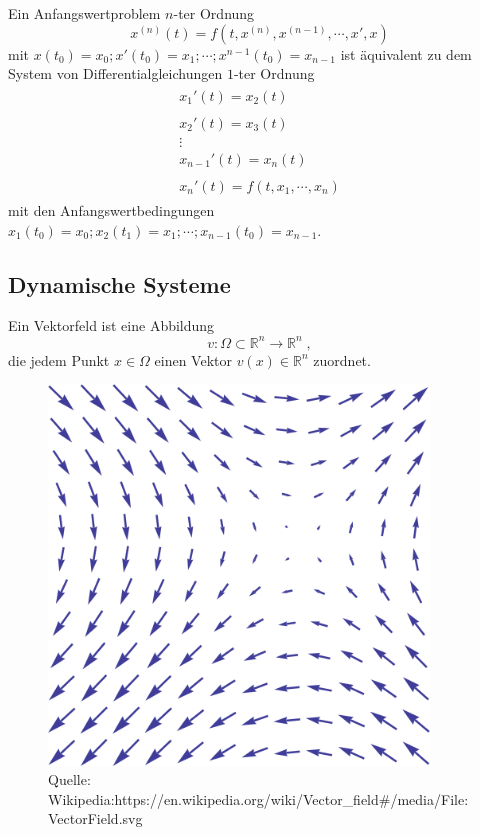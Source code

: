 \begin{Satz}
Ein Anfangswertproblem $n$-ter Ordnung
 $$ x^{(n)}(t) = f(t, x^{(n)}, x^{(n-1)} , \cdots , x', x) $$ mit  $x(t_0) = x_0 ; x'(t_0) = x_1; \cdots ; x^{n-1}(t_{0})= x_{n-1}  $ ist äquivalent zu dem System von   Differentialgleichungen $1$-ter Ordnung
\begin{align*}
\begin{matrix} x_1'(t) = x_2(t) \\  \\ x_2'(t) = x_3(t) \\  \vdots \\  x_{n-1}'(t) = x_n(t) \\ \\ x_n'(t) = f(t, x_1, \cdots, x_n )\end{matrix}
\end{align*}
mit den Anfangswertbedingungen  $x_1(t_0) = x_0 ; x_2(t_1) = x_1; \cdots ; x_{n-1}(t_{0})= x_{n-1} $.
\end{Satz}

\subsection{Dynamische Systeme}

\begin{Definition}[Vektorfeld]
Ein Vektorfeld ist eine Abbildung $$v : \Omega \subset \mathbb{R}^n \to \mathbb{R}^n \; ,$$ die jedem Punkt $x  \in \Omega$ einen Vektor $v(x) \in \mathbb{R}^n$ zuordnet.
\end{Definition}

\begin{figure}[H]
      \centering
    \includegraphics[width=0.9\textwidth]{images/480px-VectorField.png}
\caption{Quelle: Wikipedia:https://en.wikipedia.org/wiki/Vector\_field\#/media/File:VectorField.svg}
\end{figure}

